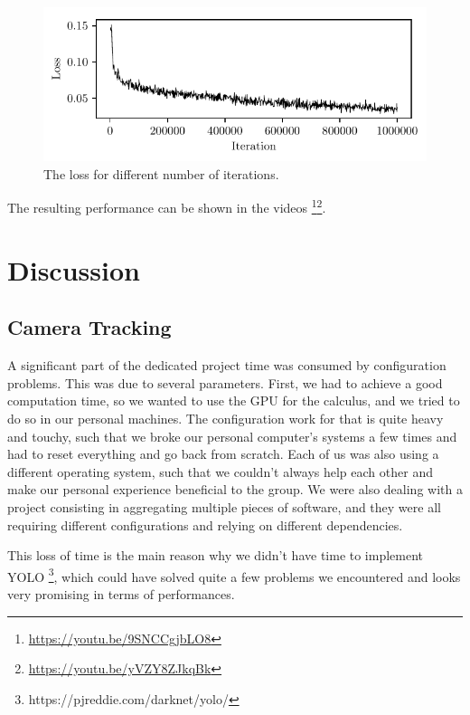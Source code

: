 \documentclass[a4paper]{article}
\begin{document}
\begin{figure}[H]
  \begin{center}
    \includegraphics[width=\textwidth]{figures/loss-plot}
  \end{center}
  \caption{The loss for different number of iterations.}
  \label{fig:loss}
\end{figure}

The resulting performance can be shown in the videos \footnote{\url{https://youtu.be/9SNCCgjbLO8}}\footnote{\url{https://youtu.be/yVZY8ZJkqBk}}.

\section{Discussion}

\subsection{Camera Tracking}

A significant part of the dedicated project time was consumed by configuration problems.
This was due to several parameters. First, we had to achieve a good computation time,
so we wanted to use the GPU for the calculus, and we tried to do so in our personal machines.
The configuration work for that is quite heavy and touchy, such that we broke our
personal computer's systems a few times and had to reset everything and go back
from scratch. Each of us was also using a different operating system, such that
we couldn't always help each other and make our personal experience beneficial
to the group. We were also dealing with a project consisting in aggregating
multiple pieces of software, and they were all requiring different
configurations and relying on different dependencies.


This loss of time is the main reason why we didn't have time to implement YOLO
\footnote{https://pjreddie.com/darknet/yolo/},
which could have solved quite a few problems we encountered and looks very promising
in terms of performances.
\end{document}
